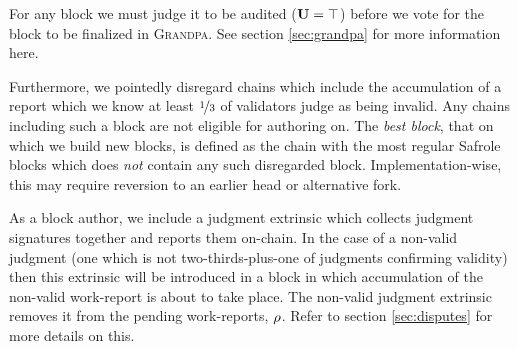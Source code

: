 For any block we must judge it to be audited (\ie $\mathbf{U} = \top$) before we vote for the block to be finalized in \textsc{Grandpa}. See section \ref{sec:grandpa} for more information here.

Furthermore, we pointedly disregard chains which include the accumulation of a report which we know at least $\nicefrac{1}{3}$ of validators judge as being invalid. Any chains including such a block are not eligible for authoring on. The \emph{best block}, \ie that on which we build new blocks, is defined as the chain with the most regular Safrole blocks which does \emph{not} contain any such disregarded block. Implementation-wise, this may require reversion to an earlier head or alternative fork.

As a block author, we include a judgment extrinsic which collects judgment signatures together and reports them on-chain. In the case of a non-valid judgment (\ie one which is not two-thirds-plus-one of judgments confirming validity) then this extrinsic will be introduced in a block in which accumulation of the non-valid work-report is about to take place. The non-valid judgment extrinsic removes it from the pending work-reports, $\rho$. Refer to section \ref{sec:disputes} for more details on this.




